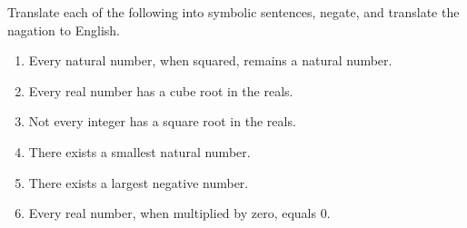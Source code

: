\documentclass[12pt]{amsart}
\begin{document}
\begin{problem}
Translate each of the following into symbolic sentences, negate, and translate the nagation to English.

\begin{enumerate}
	\item Every natural number, when squared, remains a natural number.
	      \vspace{3cm}
	\item Every real number has a cube root in the reals.
	      \vspace{3cm}
	\item Not every integer has a square root in the reals.
	      \vspace{3cm}
	\item There exists a smallest natural number.
	      \vspace{3cm}
	\item There exists a largest negative number.
	      \vspace{3cm}
	\item Every real number, when multiplied by zero, equals 0.
	      \vspace{3cm}
\end{enumerate}
\end{problem}


\begin{problem}

\end{problem}
\end{document}

